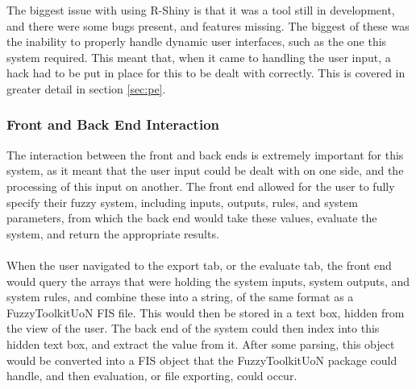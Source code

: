 \noindent 
The biggest issue with using R-Shiny is that it was a tool still in development, and there were some bugs present, and features missing. The biggest of these was the inability to properly handle dynamic user interfaces, such as the one this system required. This meant that, when it came to handling the user input, a hack had to be put in place for this to be dealt with correctly. This is covered in greater detail in section \ref{sec:pe}.

\tocless\subsubsection{Front and Back End Interaction}
\noindent 
The interaction between the front and back ends is extremely important for this system, as it meant that the user input could be dealt with on one side, and the processing of this input on another. The front end allowed for the user to fully specify their fuzzy system, including inputs, outputs, rules, and system parameters, from which the back end would take these values, evaluate the system, and return the appropriate results.\ \\
\ \\
When the user navigated to the export tab, or the evaluate tab, the front end would query the arrays that were holding the system inputs, system outputs, and system rules, and combine these into a string, of the same format as a FuzzyToolkitUoN FIS file. This would then be stored in a text box, hidden from the view of the user. The back end of the system could then index into this hidden text box, and extract the value from it. After some parsing, this object would be converted into a FIS object that the FuzzyToolkitUoN package could handle, and then evaluation, or file exporting, could occur.

